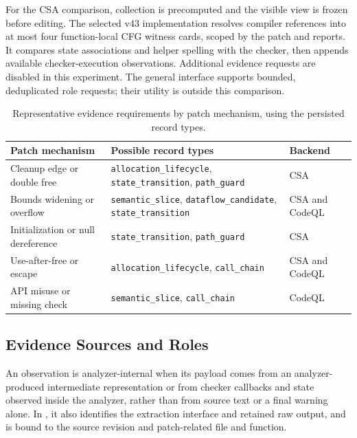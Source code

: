 For the CSA comparison, collection is precomputed and the visible view is frozen before editing.
The selected v43 implementation resolves compiler references into at most four function-local CFG witness cards, scoped by the patch and reports.
It compares state associations and helper spelling with the checker, then appends available checker-execution observations.
Additional evidence requests are disabled in this experiment.
The general interface supports bounded, deduplicated role requests; their utility is outside this comparison.

\begin{table}[!htbp]
\centering
\caption{Representative evidence requirements by patch mechanism, using the persisted record types.}
\label{tab:evidence-routing}
\begingroup\FTTableSetup
\begin{tabular}{>{\raggedright\arraybackslash}p{}|>{\raggedright\arraybackslash}p{}|>{\raggedright\arraybackslash}p{}}
\hline\hline
Patch mechanism & Possible record types & Backend \\
\hline
Cleanup edge or double free & \texttt{allocation\_lifecycle}, \texttt{state\_transition}, \texttt{path\_guard} & CSA \\
Bounds widening or overflow & \texttt{semantic\_slice}, \texttt{dataflow\_candidate}, \texttt{state\_transition} & CSA and CodeQL \\
Initialization or null dereference & \texttt{state\_transition}, \texttt{path\_guard} & CSA \\
Use-after-free or escape & \texttt{allocation\_lifecycle}, \texttt{call\_chain} & CSA and CodeQL \\
API misuse or missing check & \texttt{semantic\_slice}, \texttt{call\_chain} & CodeQL \\
\hline\hline
\end{tabular}
\endgroup
\end{table}

\subsection{Evidence Sources and Roles}
\label{sec:evidence-roles}

\begin{definition}
An observation is analyzer-internal when its payload comes from an analyzer-produced intermediate representation or from checker callbacks and state observed inside the analyzer, rather than from source text or a final warning alone.
In \toolname, it also identifies the extraction interface and retained raw output, and is bound to the source revision and patch-related file and function.
\end{definition}

